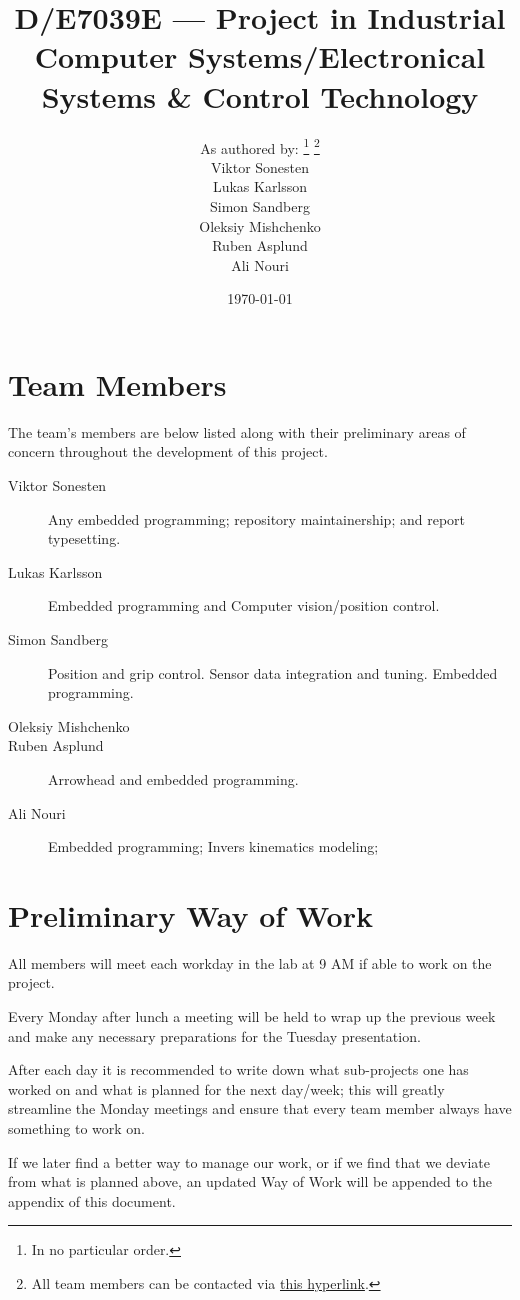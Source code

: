 \documentclass[twocolumn]{article}
\title{D/E7039E --- Project in Industrial Computer Systems/Electronical Systems \& Control Technology}
\author{
As authored by:
\footnote{In no particular order.}
\footnote{All team members can be contacted via
\href{mailto:vikson-6@student.ltu.se;lukkar-4@student.ltu.se;simpen-1@student.ltu.se;olemis-6@student.ltu.se;rubasp-6@student.ltu.se;alinou-6@student.ltu.se}{this hyperlink}.} \\
Viktor Sonesten \hypermail{vikson-6@student.ltu.se} \\
Lukas Karlsson \hypermail{lukkar-4@student.ltu.se} \\
Simon Sandberg \hypermail{simpen-1@student.ltu.se} \\
Oleksiy Mishchenko \hypermail{olemis-6@student.ltu.se} \\
Ruben Asplund \hypermail{rubasp-6@student.ltu.se} \\
Ali Nouri \hypermail{alinou-6@student.ltu.se}
}
\date{\today}
\begin{document}
\maketitle

\appendix
\section{Team Members}
The team's members are below listed along with their preliminary areas of concern throughout the development of this project.

\begin{description}
    \item[Viktor Sonesten]
    Any embedded programming;
    repository maintainership; and
    report typesetting.

    \item[Lukas Karlsson]
    Embedded programming and
    Computer vision/position control.
    \item[Simon Sandberg]
    Position and grip control.
    Sensor data integration and tuning.
    Embedded programming.
    \item[Oleksiy Mishchenko]
    \item[Ruben Asplund]
    Arrowhead and embedded programming.
    \item[Ali Nouri]
    Embedded programming;
    Invers kinematics modeling;
\end{description}

\section{Preliminary Way of Work}
All members will meet each workday in the lab at 9 AM if able to work on the project.

Every Monday after lunch a meeting will be held to wrap up the previous week and make any necessary preparations for the Tuesday presentation.

After each day it is recommended to write down what sub-projects one has worked on and what is planned for the next day/week;
this will greatly streamline the Monday meetings and ensure that every team member always have something to work on.

If we later find a better way to manage our work,
or if we find that we deviate from what is planned above,
an updated Way of Work will be appended to the appendix of this document.
\end{document}
